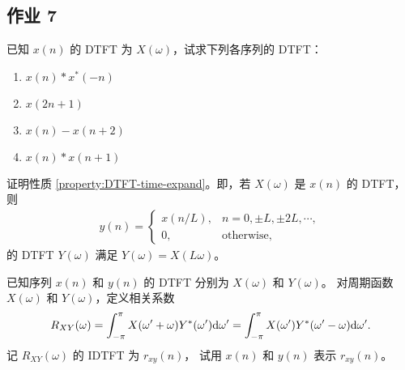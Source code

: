 \subsection{作业 7}

\begin{homework}
    已知 $x(n)$ 的 DTFT 为 $X(\omega)$，试求下列各序列的 DTFT：
    \begin{enumerate}[label=(\arabic*)]
        \item $x(n) * x^*(-n)$
        \item $x(2n + 1)$
        \item $x(n) - x(n + 2)$
        \item $x(n) * x(n + 1)$
    \end{enumerate}
\end{homework}

\begin{homework}
    证明性质 \ref{property:DTFT-time-expand}。即，若 $X(\omega)$ 是 $x(n)$ 的 DTFT，则
    \begin{align*}
        y(n) = \begin{cases}
            x(n / L), & n = 0, \pm L, \pm 2L, \cdots, \\
            0, & \text{otherwise},
        \end{cases}
    \end{align*}
    的 DTFT $Y(\omega)$ 满足 $Y(\omega) = X(L \omega)$。
\end{homework}

\begin{homework}
    已知序列 $x(n)$ 和 $y(n)$ 的 DTFT 分别为 $X(\omega)$ 和 $Y(\omega)$。
    对周期函数 $X(\omega)$ 和 $Y(\omega)$，定义相关系数
    \begin{align*}
        R_{XY}(\omega) = \int_{-\pi}^{\pi}X(\omega' + \omega)Y^*(\omega')\mathrm{d}\omega'
            = \int_{-\pi}^{\pi}X(\omega')Y^*(\omega' - \omega)\mathrm{d}\omega'.
    \end{align*}
    记 $R_{XY}(\omega)$ 的 IDTFT 为 $r_{xy}(n)$，
    试用 $x(n)$ 和 $y(n)$ 表示 $r_{xy}(n)$。
\end{homework}
